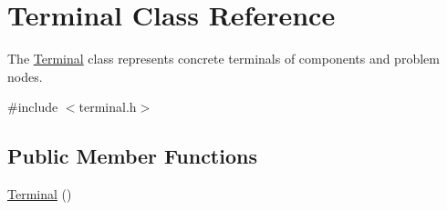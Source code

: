 \hypertarget{class_terminal}{}\section{Terminal Class Reference}
\label{class_terminal}


The \hyperlink{class_terminal}{Terminal} class represents concrete terminals of components and problem nodes.  




{\ttfamily \#include $<$terminal.\+h$>$}

\subsection*{Public Member Functions}
\begin{DoxyCompactItemize}
\item 
\hyperlink{class_terminal_aa448509b5aa1ece53c3d86385655be0e}{Terminal} ()\hypertarget{class_terminal_aa448509b5aa1ece53c3d86385655be0e}{}\label{class_terminal_aa448509b5aa1ece53c3d86385655be0e}


\end{DoxyCompactItemize}
